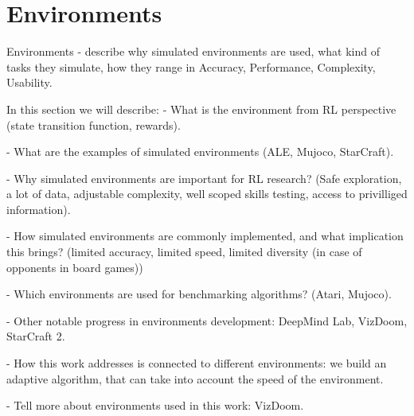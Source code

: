 \section{Environments}

Environments - describe why simulated environments are used, what kind of
tasks they simulate, how they range in Accuracy, Performance, Complexity,
Usability.

In this section we will describe:
- What is the environment from RL perspective (state transition function, rewards).

- What are the examples of simulated environments (ALE, Mujoco, StarCraft).

- Why simulated environments are important for RL research? (Safe exploration, a lot of data,
adjustable complexity, well scoped skills testing, access to privilliged information).

- How simulated environments are commonly implemented, and what implication this brings?
(limited accuracy, limited speed, limited diversity (in case of opponents in board games))

- Which environments are used for benchmarking algorithms? (Atari, Mujoco).

- Other notable progress in environments development: DeepMind Lab, VizDoom, StarCraft 2.

- How this work addresses is connected to different environments: we build an adaptive algorithm,
that can take into account the speed of the environment.

- Tell more about environments used in this work: VizDoom.

%
%
